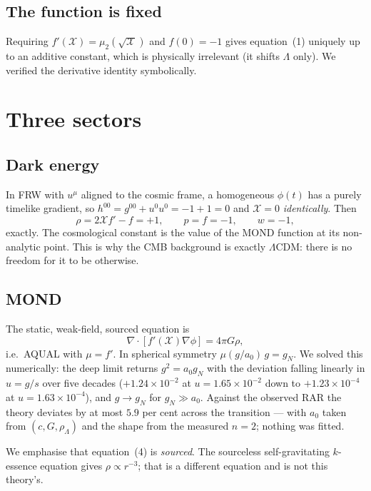 \documentclass[useAMS,usenatbib]{mnras}
\begin{document}
\subsection{The function is fixed}

Requiring $f'(\mathcal{X})=\mu_2(\sqrt{\mathcal{X}})$ and $f(0)=-1$ gives
equation~(1) uniquely up to an additive constant, which is physically
irrelevant (it shifts $\Lambda$ only).  We verified the derivative identity
symbolically.

\section{Three sectors}

\subsection{Dark energy}

In FRW with $u^\mu$ aligned to the cosmic frame, a homogeneous $\phi(t)$ has
a purely timelike gradient, so $h^{00}=g^{00}+u^0u^0=-1+1=0$ and
$\mathcal{X}=0$ \emph{identically}.  Then
\begin{equation}
\rho=2\mathcal{X}f'-f=+1,\qquad p=f=-1,\qquad w=-1,
\end{equation}
exactly.  The cosmological constant is the value of the MOND function at its
non-analytic point.  This is why the CMB background is exactly $\Lambda$CDM:
there is no freedom for it to be otherwise.

\subsection{MOND}

The static, weak-field, sourced equation is
\begin{equation}
\nabla\!\cdot\!\left[f'(\mathcal{X})\nabla\phi\right]=4\pi G\rho,
\end{equation}
i.e.\ AQUAL with $\mu=f'$.  In spherical symmetry
$\mu(g/a_0)\,g=g_N$.  We solved this numerically: the deep limit returns
$g^2=a_0g_N$ with the deviation falling linearly in $u=g/s$ over five
decades ($+1.24\times10^{-2}$ at $u=1.65\times10^{-2}$ down to
$+1.23\times10^{-4}$ at $u=1.63\times10^{-4}$), and $g\to g_N$ for
$g_N\gg a_0$.  Against the observed RAR the theory deviates by at most
$5.9$ per cent across the transition --- with $a_0$ taken from
$(c,G,\rho_\Lambda)$ and the shape from the measured $n=2$; nothing was
fitted.

We emphasise that equation~(4) is \emph{sourced}.  The sourceless
self-gravitating $k$-essence equation gives $\rho\propto r^{-3}$; that is a
different equation and is not this theory's.
\end{document}
